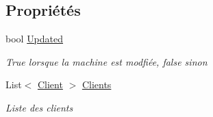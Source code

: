 \subsection*{Propriétés}
\begin{DoxyCompactItemize}
\item 
bool \mbox{\hyperlink{class_m_t_connect_agent_1_1_form_ajout_machine_ab24ec6044e36da1d0b618df5cccd9870}{Updated}}
\begin{DoxyCompactList}\small\item\em True lorsque la machine est modfiée, false sinon \end{DoxyCompactList}\item 
List$<$ \mbox{\hyperlink{class_m_t_connect_agent_1_1_model_1_1_client}{Client}} $>$ \mbox{\hyperlink{class_m_t_connect_agent_1_1_form_ajout_machine_a81292c7cbf049dad49be39272b3dedc6}{Clients}}
\begin{DoxyCompactList}\small\item\em Liste des clients \end{DoxyCompactList}\end{DoxyCompactItemize}
